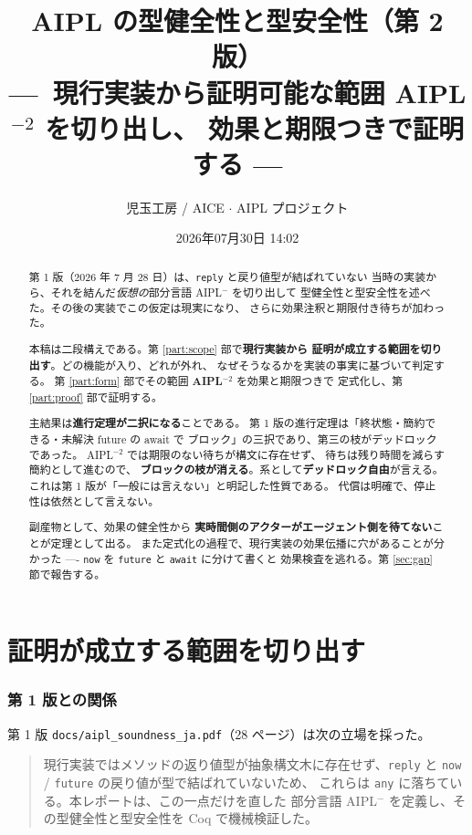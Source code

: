 \documentclass[11pt,a4paper]{ltjsarticle}
\title{AIPL の型健全性と型安全性（第 2 版）\\
{\large ---\ 現行実装から証明可能な範囲 AIPL$^{-2}$ を切り出し、
効果と期限つきで証明する ---}}
\author{児玉工房 / AICE $\cdot$ AIPL プロジェクト}
\date{2026年07月30日 14:02}
\theoremstyle{definition}
\theoremstyle{remark}
\begin{document}
\maketitle

\begin{abstract}
第 1 版（2026 年 7 月 28 日）は、\texttt{reply} と戻り値型が結ばれていない
当時の実装から、それを結んだ\emph{仮想の}部分言語 AIPL$^-$ を切り出して
型健全性と型安全性を述べた。その後の実装でこの仮定は現実になり、
さらに効果注釈と期限付き待ちが加わった。

本稿は二段構えである。第 \ref{part:scope} 部で\textbf{現行実装から
証明が成立する範囲を切り出す}。どの機能が入り、どれが外れ、
なぜそうなるかを実装の事実に基づいて判定する。
第 \ref{part:form} 部でその範囲 \textbf{AIPL$^{-2}$} を効果と期限つきで
定式化し、第 \ref{part:proof} 部で証明する。

主結果は\textbf{進行定理が二択になる}ことである。
第 1 版の進行定理は「終状態・簡約できる・未解決 future の await で
ブロック」の三択であり、第三の枝がデッドロックであった。
AIPL$^{-2}$ では期限のない待ちが構文に存在せず、
待ちは残り時間を減らす簡約として進むので、
\textbf{ブロックの枝が消える}。系として\textbf{デッドロック自由}が言える。
これは第 1 版が「一般には言えない」と明記した性質である。
代償は明確で、停止性は依然として言えない。

副産物として、効果の健全性から
\textbf{実時間側のアクターがエージェント側を待てない}ことが定理として出る。
また定式化の過程で、現行実装の効果伝播に穴があることが分かった ----
\texttt{now} を \texttt{future} と \texttt{await} に分けて書くと
効果検査を逃れる。第 \ref{sec:gap} 節で報告する。
\end{abstract}

\tableofcontents

\part{証明が成立する範囲を切り出す}
\label{part:scope}

\section{第 1 版との関係}

第 1 版 \texttt{docs/aipl\_soundness\_ja.pdf}（28 ページ）は次の立場を採った。

\begin{quote}
\small
現行実装ではメソッドの返り値型が抽象構文木に存在せず、\texttt{reply} と
\texttt{now} / \texttt{future} の戻り値が型で結ばれていないため、
これらは \texttt{any} に落ちている。本レポートは、この一点だけを直した
部分言語 AIPL$^-$ を定義し、その型健全性と型安全性を Coq で機械検証した。
\end{quote}
\end{document}
